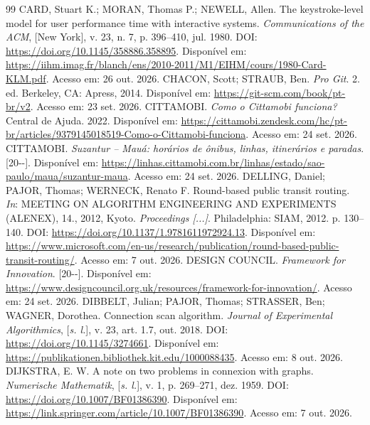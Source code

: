 \documentclass[12pt,oneside,a4paper,brazil,chapter=TITLE]{abntex2}
\begin{document}
\begin{thebibliography}{99}
 CARD, Stuart K.; MORAN, Thomas P.; NEWELL, Allen. The keystroke-level model for user performance time with interactive systems. \textit{Communications of the ACM}, [New York], v. 23, n. 7, p. 396--410, jul. 1980. DOI: \url{https://doi.org/10.1145/358886.358895}. Disponível em: \url{https://iihm.imag.fr/blanch/ens/2010-2011/M1/EIHM/cours/1980-Card-KLM.pdf}. Acesso em: 26 out. 2026.
 CHACON, Scott; STRAUB, Ben. \textit{Pro Git}. 2. ed. Berkeley, CA: Apress, 2014. Disponível em: \url{https://git-scm.com/book/pt-br/v2}. Acesso em: 23 set. 2026.
 CITTAMOBI. \textit{Como o Cittamobi funciona?} Central de Ajuda. 2022. Disponível em: \url{https://cittamobi.zendesk.com/hc/pt-br/articles/9379145018519-Como-o-Cittamobi-funciona}. Acesso em: 24 set. 2026.
 CITTAMOBI. \textit{Suzantur -- Mauá: horários de ônibus, linhas, itinerários e paradas}. [20\mbox{-}\mbox{-}]. Disponível em: \url{https://linhas.cittamobi.com.br/linhas/estado/sao-paulo/maua/suzantur-maua}. Acesso em: 24 set. 2026.
 DELLING, Daniel; PAJOR, Thomas; WERNECK, Renato F. Round-based public transit routing. \textit{In}: MEETING ON ALGORITHM ENGINEERING AND EXPERIMENTS (ALENEX), 14., 2012, Kyoto. \textit{Proceedings [...]}. Philadelphia: SIAM, 2012. p. 130--140. DOI: \url{https://doi.org/10.1137/1.9781611972924.13}. Disponível em: \url{https://www.microsoft.com/en-us/research/publication/round-based-public-transit-routing/}. Acesso em: 7 out. 2026.
 DESIGN COUNCIL. \textit{Framework for Innovation}. [20\mbox{-}\mbox{-}]. Disponível em: \url{https://www.designcouncil.org.uk/resources/framework-for-innovation/}. Acesso em: 24 set. 2026.
 DIBBELT, Julian; PAJOR, Thomas; STRASSER, Ben; WAGNER, Dorothea. Connection scan algorithm. \textit{Journal of Experimental Algorithmics}, [\textit{s. l.}], v. 23, art. 1.7, out. 2018. DOI: \url{https://doi.org/10.1145/3274661}. Disponível em: \url{https://publikationen.bibliothek.kit.edu/1000088435}. Acesso em: 8 out. 2026.
 DIJKSTRA, E. W. A note on two problems in connexion with graphs. \textit{Numerische Mathematik}, [\textit{s. l.}], v. 1, p. 269--271, dez. 1959. DOI: \url{https://doi.org/10.1007/BF01386390}. Disponível em: \url{https://link.springer.com/article/10.1007/BF01386390}. Acesso em: 7 out. 2026.

\end{thebibliography}
\end{document}
